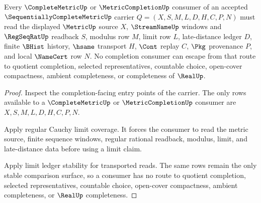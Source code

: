 \begin{theorem}
\label{thm:sequentially-complete-metric-completion-consumer-nonescape}
Every $\CompleteMetricUp$ or $\MetricCompletionUp$ consumer of an accepted $\SequentiallyCompleteMetricUp$ carrier $Q=(X,S,M,L,D,H,C,P,N)$ must read the displayed $\MetricUp$ source $X$, $\StreamNameUp$ windows and $\RegSeqRatUp$ readback $S$, modulus row $M$, limit row $L$, late-distance ledger $D$, finite $\BHist$ history, $\hsame$ transport $H$, $\Cont$ replay $C$, $\Pkg$ provenance $P$, and local $\NameCert$ row $N$. No completion consumer can escape from that route to quotient completion, selected representatives, countable choice, open-cover compactness, ambient completeness, or completeness of $\RealUp$.
\end{theorem}
\begin{proof}
Inspect the completion-facing entry points of the carrier. The only rows available to a $\CompleteMetricUp$ or $\MetricCompletionUp$ consumer are $X,S,M,L,D,H,C,P,N$.

Apply regular Cauchy limit coverage. It forces the consumer to read the metric source, finite sequence windows, regular rational readback, modulus, limit, and late-distance data before using a limit claim.

Apply limit ledger stability for transported reads. The same rows remain the only stable comparison surface, so a consumer has no route to quotient completion, selected representatives, countable choice, open-cover compactness, ambient completeness, or $\RealUp$ completeness.
\end{proof}

